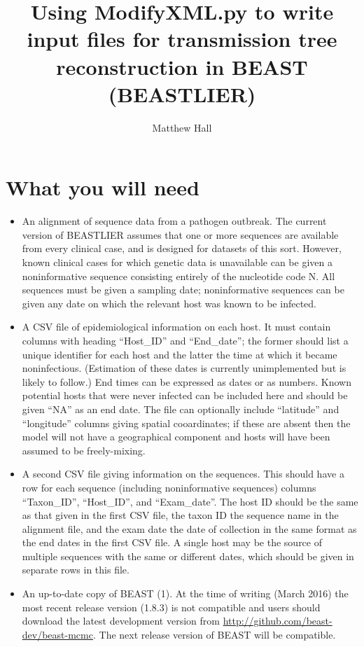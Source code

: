 \documentclass[]{article}
\title{Using ModifyXML.py to write input files for transmission tree reconstruction in BEAST (BEASTLIER)}
\author{Matthew Hall}
\date{}
\begin{document}
\maketitle

\section{What you will need}

\begin{itemize}
	\item {An alignment of sequence data from a pathogen outbreak. The current version of BEASTLIER assumes that one or more sequences are available from every clinical case, and is designed for datasets of this sort. However, known clinical cases for which genetic data is unavailable can be given a noninformative sequence consisting entirely of the nucleotide code N. All sequences must be given a sampling date; noninformative sequences can be given any date on which the relevant host was known to be infected.}
	\item{A CSV file of epidemiological information on each host. It must contain columns with heading ``Host\_ID'' and ``End\_date''; the former should list a unique identifier for each host and the latter the time at which it became noninfectious. (Estimation of these dates is currently unimplemented but is likely to follow.) End times can be expressed as dates or as numbers. Known potential hosts that were never infected can be included here and should be given ``NA'' as an end date. The file can optionally include ``latitude'' and ``longitude'' columns giving spatial cooardinates; if these are absent then the model will not have a geographical component and hosts will have been assumed to be freely-mixing.}
	\item{A second CSV file giving information on the sequences. This should have a row for each sequence (including noninformative sequences) columns ``Taxon\_ID'', ``Host\_ID'', and ``Exam\_date''. The host ID should be the same as that given in the first CSV file, the taxon ID the sequence name in the alignment file, and the exam date the date of collection in the same format as the end dates in the first CSV file. A single host may be the source of multiple sequences with the same or different dates, which should be given in separate rows in this file.}
	\item{An up-to-date copy of BEAST (1). At the time of writing (March 2016) the most recent release version (1.8.3) is not compatible and users should download the latest development version from \url{http://github.com/beast-dev/beast-mcmc}. The next release version of BEAST will be compatible.
		
}
\end{itemize}
\end{document}
